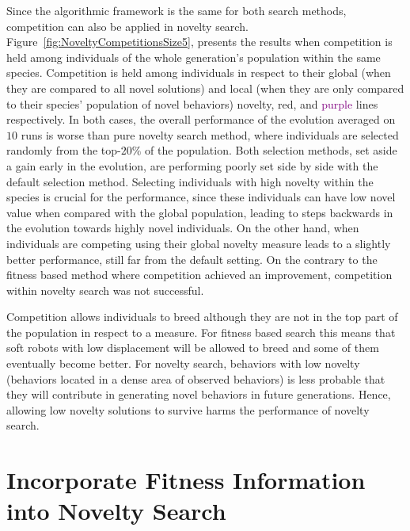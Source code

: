 Since the algorithmic framework is the same for both search methods, competition can also be applied in novelty search. Figure~\ref{fig:NoveltyCompetitionsSize5}, presents the results when competition is held among individuals of the whole generation's population within the same species. Competition is held among individuals in respect to their global (when they are compared to all novel solutions) and local (when they are only compared to their species' population of novel behaviors) novelty, \textcolor{BrickRed}{red}, and \textcolor{Purple}{purple} lines respectively. In both cases, the overall performance of the evolution averaged on $10$ runs is worse than pure novelty search method, where individuals are selected randomly from the top-$20\%$ of the population. Both selection methods, set aside a gain early in the evolution, are performing poorly set side by side with the default selection method. Selecting individuals with high novelty within the species is crucial for the performance, since these individuals can have low novel value when compared with the global population, leading to steps backwards in the evolution towards highly novel individuals. On the other hand, when individuals are competing using their global novelty measure leads to a slightly better performance, still far from the default setting. On the contrary to the fitness based method where competition achieved an improvement, competition within novelty search was not successful. 

Competition allows individuals to breed although they are not in the top part of the population in respect to a measure. For fitness based search this means that soft robots with low displacement will be allowed to breed and some of them eventually become better. For novelty search, behaviors with low novelty (behaviors located in a dense area of observed behaviors) is less probable that they will contribute in generating novel behaviors in future generations. Hence, allowing low novelty solutions to survive harms the performance of novelty search.


\section{Incorporate Fitness Information into Novelty Search}

